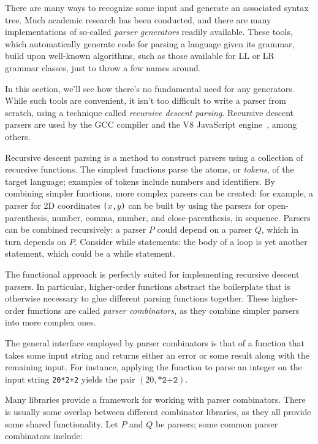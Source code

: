 \documentclass[UdineBachThesis,american,11pt]{PhdThesis}
\begin{document}
  There are many ways to recognize some input and generate an associated syntax
  tree. Much academic research has been conducted, and there are many
  implementations of so-called \emph{parser generators} readily available. These
  tools, which automatically generate code for parsing a language given its
  grammar, build upon well-known algorithms, such as those available for LL or
  LR~\cite{lr} grammar classes, just to throw a few names around.

  In this section, we'll see how there's no fundamental need for any generators.
  While such tools are convenient, it isn't too difficult to write a parser from
  scratch, using a technique called \emph{recursive descent parsing}. Recursive
  descent parsers are used by the GCC compiler and the V8 JavaScript
  engine~\cite{recursive-descent-parsing}, among others.

  Recursive descent parsing is a method to construct parsers using a collection
  of recursive functions. The simplest functions parse the atoms, or
  \emph{tokens}, of the target language; examples of tokens include numbers and
  identifiers. By combining simpler functions, more complex parsers can be
  created: for example, a parser for 2D coordinates \mbox{\texttt{($x$,$y$)}}
  can be built by using the parsers for open-parenthesis, number, comma, number,
  and close-parenthesis, in sequence. Parsers can be combined recursively: a
  parser $P$ could depend on a parser $Q$, which in turn depends on $P$\@.
  Consider while statements: the body of a loop is yet another statement, which
  could be a while statement.

  The functional approach is perfectly suited for implementing recursive descent
  parsers. In particular, higher-order functions abstract the boilerplate that
  is otherwise necessary to glue different parsing functions together. These
  higher-order functions are called \emph{parser combinators}, as they combine
  simpler parsers into more complex ones.

  The general interface employed by parser combinators is that of a function
  that takes some input string and returns either an error or some result along
  with the remaining input. For instance, applying the function to parse an
  integer on the input string \mbox{\texttt{20*2+2}} yields the pair
  \mbox{$\left(20, \texttt{*2+2}\right)$}.

  Many libraries provide a framework for working with parser combinators. There
  is usually some overlap between different combinator libraries, as they all
  provide some shared functionality. Let $P$ and $Q$ be parsers; some common
  parser combinators include:
\end{document}
